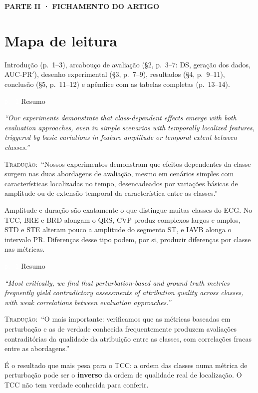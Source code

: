 \documentclass[11pt,a4paper]{article}
\newcommand{\pagechip}[1]{{\setlength{\fboxsep}{1.5pt}\colorbox{cAcc}{\textcolor{white}{\scriptsize\texttt{#1}}}}}
\newcommand{\partbar}[1]{\par\vspace{1.2em}\noindent\colorbox{black!80}{\parbox{\dimexpr\linewidth-2\fboxsep}{\color{white}\bfseries\sffamily\MakeUppercase{#1}}}\par\vspace{0.4em}}
\newenvironment{origquote}{\par\itshape\small}{\par}
\newenvironment{tradquote}{\par\small\textsc{Tradução:}\ }{\par}
\newcommand{\explab}[1]{\par\smallskip{\small\color{cAcc}\textbf{\MakeUppercase{#1}}}\par}
\begin{document}
\partbar{Parte II · Fichamento do artigo}

\section{Mapa de leitura}
Introdução (p.~1--3), arcabouço de avaliação (§2, p.~3--7: DS, geração dos dados, AUC-PR$'$), desenho experimental (§3, p.~7--9), resultados (§4, p.~9--11), conclusão (§5, p.~11--12) e apêndice com as tabelas completas (p.~13--14).

\begin{citacard}{\pagechip{p. 1} Resumo}
\begin{origquote}“Our experiments demonstrate that class-dependent effects emerge with both evaluation approaches, even in simple scenarios with temporally localized features, triggered by basic variations in feature amplitude or temporal extent between classes.”\end{origquote}
\begin{tradquote}“Nossos experimentos demonstram que efeitos dependentes da classe surgem nas duas abordagens de avaliação, mesmo em cenários simples com características localizadas no tempo, desencadeados por variações básicas de amplitude ou de extensão temporal da característica entre as classes.”\end{tradquote}
\explab{Explicação}
Amplitude e duração são exatamente o que distingue muitas classes do ECG. No TCC, BRE e BRD alongam o QRS, CVP produz complexos largos e amplos, STD e STE alteram pouco a amplitude do segmento ST, e IAVB alonga o intervalo PR. Diferenças desse tipo podem, por si, produzir diferenças por classe nas métricas.
\end{citacard}

\begin{citacard}{\pagechip{p. 1} Resumo}
\begin{origquote}“Most critically, we find that perturbation-based and ground truth metrics frequently yield contradictory assessments of attribution quality across classes, with weak correlations between evaluation approaches.”\end{origquote}
\begin{tradquote}“O mais importante: verificamos que as métricas baseadas em perturbação e as de verdade conhecida frequentemente produzem avaliações contraditórias da qualidade da atribuição entre as classes, com correlações fracas entre as abordagens.”\end{tradquote}
\explab{Explicação}
É o resultado que mais pesa para o TCC: a ordem das classes numa métrica de perturbação pode ser o \textbf{inverso} da ordem de qualidade real de localização. O TCC não tem verdade conhecida para conferir.
\end{citacard}
\end{document}
